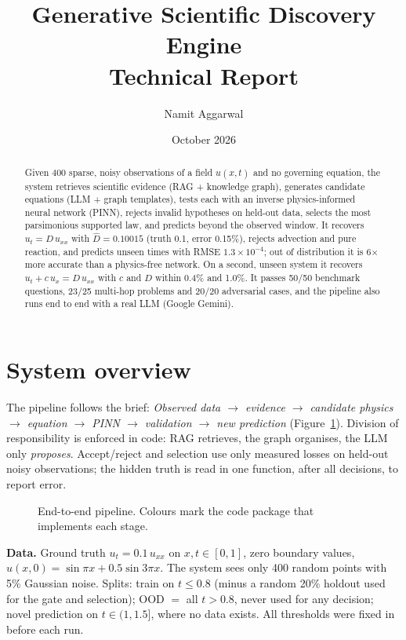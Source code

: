 \documentclass[11pt,a4paper]{article}
\title{\textbf{Generative Scientific Discovery Engine}\\[3pt]\large Technical Report}
\author{Namit Aggarwal}
\date{October 2026}
\begin{document}
\maketitle
\vspace{-6mm}

\begin{abstract}
\noindent Given 400 sparse, noisy observations of a field $u(x,t)$ and no governing equation, the system retrieves
scientific evidence (RAG + knowledge graph), generates candidate equations (LLM + graph templates), tests each with an
inverse physics-informed neural network (PINN), rejects invalid hypotheses on held-out data, selects the most
parsimonious supported law, and predicts beyond the observed window. It recovers $u_t = D\,u_{xx}$ with
$\hat D = 0.10015$ (truth 0.1, error 0.15\%), rejects advection and pure reaction, and predicts unseen times with
RMSE $1.3\times10^{-4}$; out of distribution it is 6$\times$ more accurate than a physics-free network. On a second,
unseen system it recovers $u_t + c\,u_x = D\,u_{xx}$ with $c$ and $D$ within 0.4\% and 1.0\%. It passes 50/50 benchmark questions, 23/25 multi-hop
problems and 20/20 adversarial cases, and the pipeline also runs end to end with a real LLM (Google Gemini).
\end{abstract}

\section{System overview}

The pipeline follows the brief: \emph{Observed data $\to$ evidence $\to$ candidate physics $\to$ equation $\to$ PINN
$\to$ validation $\to$ new prediction} (Figure~\ref{fig:pipeline}). Division of responsibility is enforced in code:
RAG retrieves, the graph organises, the LLM only \emph{proposes}. Accept/reject and selection use only measured losses
on held-out noisy observations; the hidden truth is read in one function, after all decisions, to report error.

\begin{figure}[!tbp]
\centering
\scalebox{0.85}{}
\caption{End-to-end pipeline. Colours mark the code package that implements each stage.}
\label{fig:pipeline}
\end{figure}

\textbf{Data.} Ground truth $u_t = 0.1\,u_{xx}$ on $x,t\in[0,1]$, zero boundary values,
$u(x,0)=\sin\pi x + 0.5\sin 3\pi x$. The system sees only 400 random points with 5\% Gaussian noise. Splits: train on
$t\le0.8$ (minus a random 20\% holdout used for the gate and selection); OOD $=$ all $t>0.8$, never used for any
decision; novel prediction on $t\in(1,1.5]$, where no data exists. All thresholds were fixed in 
before each run.
\end{document}

